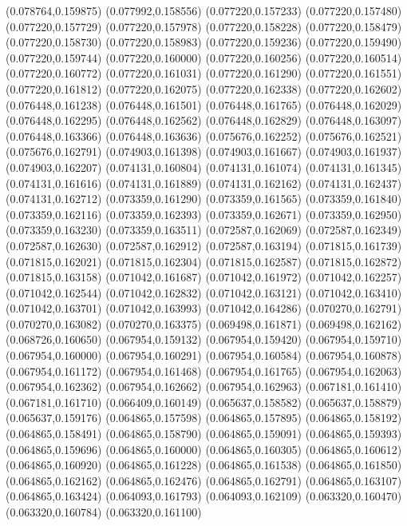 (0.078764,0.159875)
(0.077992,0.158556)
(0.077220,0.157233)
(0.077220,0.157480)
(0.077220,0.157729)
(0.077220,0.157978)
(0.077220,0.158228)
(0.077220,0.158479)
(0.077220,0.158730)
(0.077220,0.158983)
(0.077220,0.159236)
(0.077220,0.159490)
(0.077220,0.159744)
(0.077220,0.160000)
(0.077220,0.160256)
(0.077220,0.160514)
(0.077220,0.160772)
(0.077220,0.161031)
(0.077220,0.161290)
(0.077220,0.161551)
(0.077220,0.161812)
(0.077220,0.162075)
(0.077220,0.162338)
(0.077220,0.162602)
(0.076448,0.161238)
(0.076448,0.161501)
(0.076448,0.161765)
(0.076448,0.162029)
(0.076448,0.162295)
(0.076448,0.162562)
(0.076448,0.162829)
(0.076448,0.163097)
(0.076448,0.163366)
(0.076448,0.163636)
(0.075676,0.162252)
(0.075676,0.162521)
(0.075676,0.162791)
(0.074903,0.161398)
(0.074903,0.161667)
(0.074903,0.161937)
(0.074903,0.162207)
(0.074131,0.160804)
(0.074131,0.161074)
(0.074131,0.161345)
(0.074131,0.161616)
(0.074131,0.161889)
(0.074131,0.162162)
(0.074131,0.162437)
(0.074131,0.162712)
(0.073359,0.161290)
(0.073359,0.161565)
(0.073359,0.161840)
(0.073359,0.162116)
(0.073359,0.162393)
(0.073359,0.162671)
(0.073359,0.162950)
(0.073359,0.163230)
(0.073359,0.163511)
(0.072587,0.162069)
(0.072587,0.162349)
(0.072587,0.162630)
(0.072587,0.162912)
(0.072587,0.163194)
(0.071815,0.161739)
(0.071815,0.162021)
(0.071815,0.162304)
(0.071815,0.162587)
(0.071815,0.162872)
(0.071815,0.163158)
(0.071042,0.161687)
(0.071042,0.161972)
(0.071042,0.162257)
(0.071042,0.162544)
(0.071042,0.162832)
(0.071042,0.163121)
(0.071042,0.163410)
(0.071042,0.163701)
(0.071042,0.163993)
(0.071042,0.164286)
(0.070270,0.162791)
(0.070270,0.163082)
(0.070270,0.163375)
(0.069498,0.161871)
(0.069498,0.162162)
(0.068726,0.160650)
(0.067954,0.159132)
(0.067954,0.159420)
(0.067954,0.159710)
(0.067954,0.160000)
(0.067954,0.160291)
(0.067954,0.160584)
(0.067954,0.160878)
(0.067954,0.161172)
(0.067954,0.161468)
(0.067954,0.161765)
(0.067954,0.162063)
(0.067954,0.162362)
(0.067954,0.162662)
(0.067954,0.162963)
(0.067181,0.161410)
(0.067181,0.161710)
(0.066409,0.160149)
(0.065637,0.158582)
(0.065637,0.158879)
(0.065637,0.159176)
(0.064865,0.157598)
(0.064865,0.157895)
(0.064865,0.158192)
(0.064865,0.158491)
(0.064865,0.158790)
(0.064865,0.159091)
(0.064865,0.159393)
(0.064865,0.159696)
(0.064865,0.160000)
(0.064865,0.160305)
(0.064865,0.160612)
(0.064865,0.160920)
(0.064865,0.161228)
(0.064865,0.161538)
(0.064865,0.161850)
(0.064865,0.162162)
(0.064865,0.162476)
(0.064865,0.162791)
(0.064865,0.163107)
(0.064865,0.163424)
(0.064093,0.161793)
(0.064093,0.162109)
(0.063320,0.160470)
(0.063320,0.160784)
(0.063320,0.161100)
